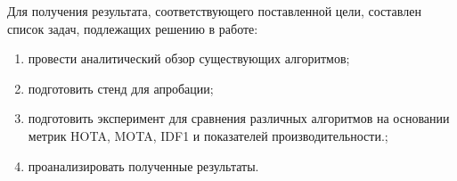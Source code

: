 Для получения результата, соответствующего поставленной цели, составлен список задач, подлежащих решению в работе:
\begin{enumerate}
    \item провести аналитический обзор существующих алгоритмов;
    \item подготовить стенд для апробации;
    \item подготовить эксперимент для сравнения различных алгоритмов на основании метрик HOTA, MOTA, IDF1 и показателей производительности.;
    \item проанализировать полученные результаты.
\end{enumerate}


\newpage
